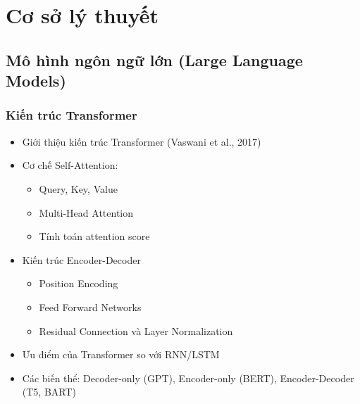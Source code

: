 
\chapter{Cơ sở lý thuyết}

\section{Mô hình ngôn ngữ lớn (Large Language Models)}

\subsection{Kiến trúc Transformer}
\begin{itemize}
    \item Giới thiệu kiến trúc Transformer (Vaswani et al., 2017)
    \item Cơ chế Self-Attention:
    \begin{itemize}
        \item Query, Key, Value
        \item Multi-Head Attention
        \item Tính toán attention score
    \end{itemize}
    \item Kiến trúc Encoder-Decoder
    \begin{itemize}
        \item Position Encoding
        \item Feed Forward Networks
        \item Residual Connection và Layer Normalization
    \end{itemize}
    \item Ưu điểm của Transformer so với RNN/LSTM
    \item Các biến thể: Decoder-only (GPT), Encoder-only (BERT), Encoder-Decoder (T5, BART)
\end{itemize}

